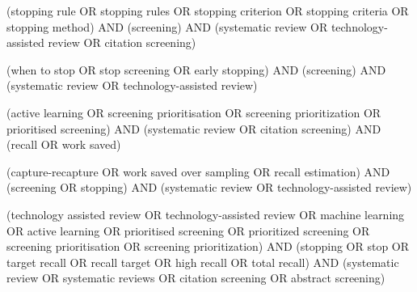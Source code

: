 \begin{description}[style=nextline,font=\normalfont\bfseries]
\item[q1a, support query] {\footnotesize\ttfamily\raggedright (\textquotedbl{}stopping rule\textquotedbl{} OR \textquotedbl{}stopping rules\textquotedbl{} OR \textquotedbl{}stopping criterion\textquotedbl{} OR \textquotedbl{}stopping criteria\textquotedbl{} OR \textquotedbl{}stopping method\textquotedbl{}) AND (screening) AND (\textquotedbl{}systematic review\textquotedbl{} OR \textquotedbl{}technology-assisted review\textquotedbl{} OR \textquotedbl{}citation screening\textquotedbl{})\par}
\item[q1b, support query] {\footnotesize\ttfamily\raggedright (\textquotedbl{}when to stop\textquotedbl{} OR \textquotedbl{}stop screening\textquotedbl{} OR \textquotedbl{}early stopping\textquotedbl{}) AND (screening) AND (\textquotedbl{}systematic review\textquotedbl{} OR \textquotedbl{}technology-assisted review\textquotedbl{})\par}
\item[q1c, support query] {\footnotesize\ttfamily\raggedright (\textquotedbl{}active learning\textquotedbl{} OR \textquotedbl{}screening prioritisation\textquotedbl{} OR \textquotedbl{}screening prioritization\textquotedbl{} OR \textquotedbl{}prioritised screening\textquotedbl{}) AND (\textquotedbl{}systematic review\textquotedbl{} OR \textquotedbl{}citation screening\textquotedbl{}) AND (recall OR \textquotedbl{}work saved\textquotedbl{})\par}
\item[q1d, support query] {\footnotesize\ttfamily\raggedright (\textquotedbl{}capture-recapture\textquotedbl{} OR \textquotedbl{}work saved over sampling\textquotedbl{} OR \textquotedbl{}recall estimation\textquotedbl{}) AND (screening OR stopping) AND (\textquotedbl{}systematic review\textquotedbl{} OR \textquotedbl{}technology-assisted review\textquotedbl{})\par}
\item[q1e, support query] {\footnotesize\ttfamily\raggedright (\textquotedbl{}technology assisted review\textquotedbl{} OR \textquotedbl{}technology-assisted review\textquotedbl{} OR \textquotedbl{}machine learning\textquotedbl{} OR \textquotedbl{}active learning\textquotedbl{} OR \textquotedbl{}prioritised screening\textquotedbl{} OR \textquotedbl{}prioritized screening\textquotedbl{} OR \textquotedbl{}screening prioritisation\textquotedbl{} OR \textquotedbl{}screening prioritization\textquotedbl{}) AND (stopping OR stop OR \textquotedbl{}target recall\textquotedbl{} OR \textquotedbl{}recall target\textquotedbl{} OR \textquotedbl{}high recall\textquotedbl{} OR \textquotedbl{}total recall\textquotedbl{}) AND (\textquotedbl{}systematic review\textquotedbl{} OR \textquotedbl{}systematic reviews\textquotedbl{} OR \textquotedbl{}citation screening\textquotedbl{} OR \textquotedbl{}abstract screening\textquotedbl{})\par}

\end{description}
